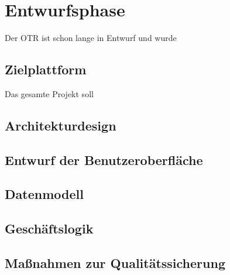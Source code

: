 \newpage
\section{Entwurfsphase}
\label{entwurfsphase}
Der \ac{OTR} ist schon lange in Entwurf und wurde 
\subsection{Zielplattform}
\label{zielplattform}
Das gesamte Projekt soll
\subsection{Architekturdesign}
\label{architekturdesign}

\subsection{Entwurf der Benutzeroberfläche}
\label{benutzeroberfläche}

\subsection{Datenmodell}
\label{datenmodell}

\subsection{Geschäftslogik}
\label{geschaeftslogik}

\subsection{Maßnahmen zur Qualitätssicherung}
\label{qualitaetssicherung}
